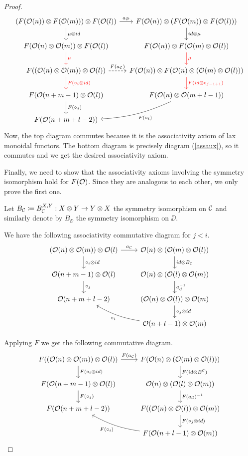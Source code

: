 \documentclass[Thesis.tex]{subfiles}
\begin{document}
\begin{proof}
      \[   
\begin{tikzcd}[column sep = 1em]
(F(\OO(n))\otimes F(\OO(m)))\otimes F(\OO(l)) \arrow[r, "a_\DD"] \arrow[d, "\mu\otimes id"] & F(\OO(n))\otimes (F(\OO(m))\otimes F(\OO(l)))\arrow[d, "id\otimes \mu"]\\
F(\OO(n)\otimes \OO(m))\otimes F(\OO(l))\arrow[d, red, "\mu"] & F(\OO(n))\otimes F(\OO(m)\otimes\OO(l))\arrow[d, red, "\mu"]\\
F((\OO(n)\otimes\OO(m))\otimes\OO(l))\arrow[d, red, "F(\circ_i\otimes id)"]\arrow[r, dashed, "F(a_\CC)"] & F(\OO(n))\otimes F(\OO(n)\otimes(\OO(m)\otimes\OO(l)))\arrow[d, red, "F(id\otimes \circ_{j-1+1})"]\\
F(\OO(n+m-1)\otimes\OO(l))\arrow[d, "F(\circ_j)"] & F(\OO(n)\otimes\OO(m+l-1))\arrow[dl, bend left = 10, "F(\circ_i)"]\\
F(\OO(n+m+l-2)) & 
\end{tikzcd}   
   \]
   Now, the top diagram commutes because it is the associativity axiom of lax monoidal functors. The bottom diagram is precisely diagram (\ref{assaux}), so it commutes and we get the desired associativity axiom.
   
   Finally, we need to show that the associativity axioms involving the symmetry isomorphism hold for $F({\mathcal O})$. Since they are analogous to each other, we only prove the first one.
   
   Let $B_{\mathcal C}\coloneqq B_{\mathcal C}^{X,Y}:X\otimes Y\to Y\otimes X$ the symmetry isomorphism on ${\mathcal C}$ and similarly denote by $B_\DD$ the symmetry isomorphism on $\DD$.
   
   We have the following associativity commutative diagram for $j<i$.
   \[
   \begin{tikzcd}
   (\OO(n)\otimes \OO(m))\otimes\OO(l)\arrow[r, "a_\CC"]\arrow[d, "\circ_i\otimes id"] & \OO(n)\otimes (\OO(m)\otimes \OO(l)) \arrow[d, "id\otimes B_\CC"] \\
   \OO(n+m-1)\otimes\OO(l)\arrow[d, "\circ_j"] & \OO(n)\otimes (\OO(l)\otimes \OO(m))\arrow[d, "a^{-1}_\CC"]\\
   \OO(n+m+l-2) & (\OO(n)\otimes\OO(l))\otimes \OO(m)\arrow[d, "\circ_j\otimes id"]\\
    & \OO(n+l-1)\otimes \OO(m)\arrow[ul, "\circ_i", bend left = 10]
   \end{tikzcd}
   \]
   
   Applying $F$ we get the following commutative diagram.
   \begin{equation}\label{assiaux}
      \begin{tikzcd}
   F((\OO(n)\otimes \OO(m))\otimes\OO(l))\arrow[r, "F(a_\CC)"]\arrow[d, "F(\circ_i\otimes id)"] & F(\OO(n)\otimes (\OO(m)\otimes \OO(l))) \arrow[d, "F(id\otimes B^\CC)"]\\
   F(\OO(n+m-1)\otimes\OO(l))\arrow[d, "F(\circ_j)"] & \OO(n)\otimes (\OO(l)\otimes \OO(m))\arrow[d, "F(a_\CC)^{-1}"]\\
   F(\OO(n+m+l-2)) &  F((\OO(n)\otimes\OO(l))\otimes \OO(m))\arrow[d, "F(\circ_j\otimes id)"]\\
     &F(\OO(n+l-1)\otimes \OO(m))\arrow[ul, "F(\circ_i)", bend left = 10]
   \end{tikzcd}
   \end{equation}
   

\end{proof}
\end{document}
